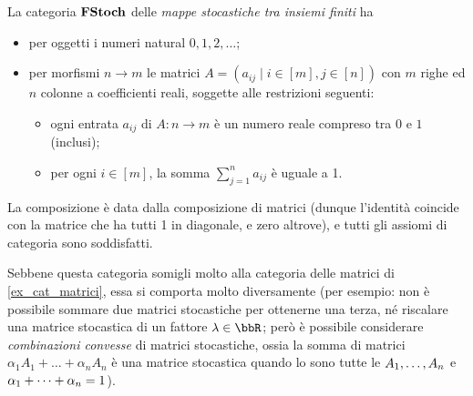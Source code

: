 \begin{example}
  La categoria $\mathbf{FStoch}$ delle \emph{mappe stocastiche tra insiemi finiti} ha 
  \begin{itemize}
    \item per oggetti i numeri natural $0,1,2,\dots$;
    \item per morfismi $n\to m$ le matrici $A=(a_{ij}\mid i\in [m], j\in[n])$ con $m$ righe ed $n$ colonne a coefficienti reali, soggette alle restrizioni seguenti: 
      \begin{itemize}
        \item ogni entrata $a_{ij}$ di $A : n\to m$ è un numero reale compreso tra $0$ e $1$ (inclusi);
        \item per ogni $i\in[m]$, la somma $\sum_{j=1}^n a_{ij}$ è uguale a 1.
      \end{itemize}
  \end{itemize}
  La composizione è data dalla composizione di matrici (dunque l'identità coincide con la matrice che ha tutti 1 in diagonale, e zero altrove), e tutti gli assiomi di categoria sono soddisfatti. 

  Sebbene questa categoria somigli molto alla categoria delle matrici di \ref{ex_cat_matrici}, essa si comporta molto diversamente (per esempio: non è possibile sommare due matrici stocastiche per ottenerne una terza, né riscalare una matrice stocastica di un fattore $\lambda\in\bbR$; però è possibile considerare \emph{combinazioni convesse} di matrici stocastiche, ossia la somma di matrici $\alpha_1 A_1+\dots + \alpha_n A_n$ è una matrice stocastica quando lo sono tutte le $\tup An,$ e $\tup\alpha n+ = 1$).
\end{example}
